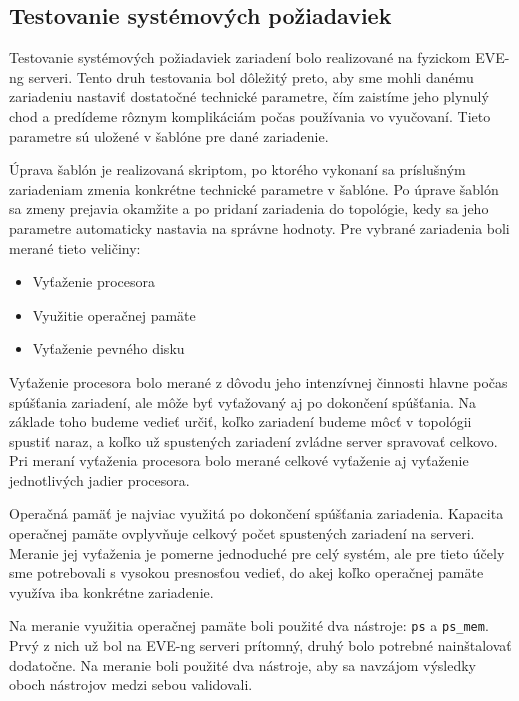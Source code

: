 \subsection{Testovanie systémových požiadaviek}
\label{chap:testovanie_zariadeni_benchmark}

Testovanie systémových požiadaviek zariadení bolo realizované na fyzickom EVE-ng serveri. Tento druh testovania bol dôležitý preto, aby sme mohli danému zariadeniu nastaviť dostatočné technické parametre, čím zaistíme jeho plynulý chod a predídeme rôznym komplikáciám počas používania vo vyučovaní. Tieto parametre sú uložené v šablóne pre dané zariadenie.

Úprava šablón je realizovaná skriptom, po ktorého vykonaní sa príslušným zariadeniam zmenia konkrétne technické parametre v šablóne. Po úprave šablón sa zmeny prejavia okamžite a po pridaní zariadenia do topológie, kedy sa jeho parametre automaticky nastavia na správne hodnoty. Pre vybrané zariadenia boli merané tieto veličiny:

\begin{itemize}[noitemsep]
    \item Vyťaženie procesora
    \item Využitie operačnej pamäte
    \item Vyťaženie pevného disku
\end{itemize}

Vyťaženie procesora bolo merané z dôvodu jeho intenzívnej činnosti hlavne počas spúšťania zariadení, ale môže byť vyťažovaný aj po dokončení spúšťania. Na základe toho budeme vedieť určiť, koľko zariadení budeme môcť v topológii spustiť naraz, a koľko už spustených zariadení zvládne server spravovať celkovo. Pri meraní vyťaženia procesora bolo merané celkové vyťaženie aj vyťaženie jednotlivých jadier procesora.

Operačná pamäť je najviac využitá po dokončení spúšťania zariadenia. Kapacita operačnej pamäte ovplyvňuje celkový počet spustených zariadení na serveri. Meranie jej vyťaženia je pomerne jednoduché pre celý systém, ale pre tieto účely sme potrebovali s vysokou presnosťou vedieť, do akej koľko operačnej pamäte využíva iba konkrétne zariadenie.

Na meranie využitia operačnej pamäte boli použité dva nástroje: \texttt{ps} a \texttt{ps\_mem}. Prvý z nich už bol na EVE-ng serveri prítomný, druhý bolo potrebné nainštalovať dodatočne. Na meranie boli použité dva nástroje, aby sa navzájom výsledky oboch nástrojov medzi sebou validovali.

